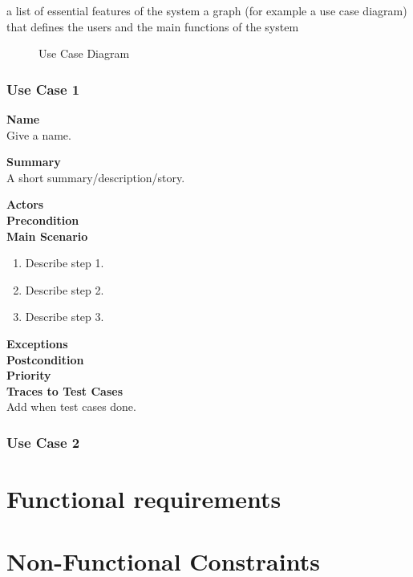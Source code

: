 \documentclass[12pt]{article}
\begin{document}
    a list of essential features of the system
    a graph (for example a use case diagram) that defines the users and the main functions of the system

\begin{figure}[htbp]
\caption{Use Case Diagram}
\label{fig:use-case-diagram}
\end{figure}

\subsubsection{Use Case 1} \label{uc:1}

\noindent
{\bf Name}\\
Give a name.

\noindent
{\bf Summary}\\
A short summary/description/story.

\noindent
{\bf Actors}\\

\noindent
{\bf Precondition}\\

\noindent
{\bf Main Scenario}\\
\vspace*{-0.2in}
\begin{enumerate}
\item Describe step 1.
\item Describe step 2.
\item Describe step 3.
\end{enumerate}

\noindent
{\bf Exceptions}\\

\noindent
{\bf Postcondition}\\

\noindent
{\bf Priority}\\

\noindent
{\bf Traces to Test Cases}\\
Add when test cases done.

\subsubsection{Use Case 2} \label{uc:2}

\section{Functional requirements}

\section{Non-Functional Constraints}
\end{document}
